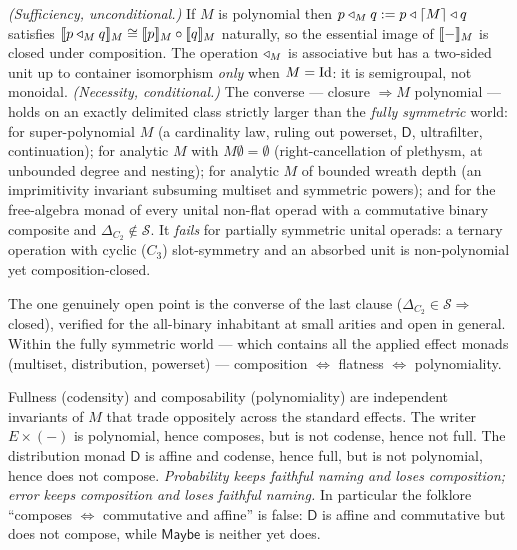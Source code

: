 \begin{theorem}[Composition $=$ polynomiality; \emph{peer-reviewed}]\label{thm:cob-compose}
\emph{(Sufficiency, unconditional.)} If $M$ is polynomial then
$p\triangleleft_M q:=p\triangleleft\lceil M\rceil\triangleleft q$ satisfies
$\llbracket p\triangleleft_M q \rrbracket_M\cong\llbracket p \rrbracket_M\circ\llbracket q \rrbracket_M$ naturally, so the essential image
of $\llbracket - \rrbracket_M$ is closed under composition. The operation $\triangleleft_M$ is associative
but has a two-sided unit up to container isomorphism \emph{only} when $M=\mathrm{Id}$: it
is semigroupal, not monoidal.
\emph{(Necessity, conditional.)} The converse --- closure $\Rightarrow M$
polynomial --- holds on an exactly delimited class strictly larger than the
\emph{fully symmetric} world: for super-polynomial $M$ (a cardinality law, ruling
out powerset, $\mathsf{D}$, ultrafilter, continuation); for analytic $M$ with
$M\emptyset=\emptyset$ (right-cancellation of plethysm, at unbounded degree and
nesting); for analytic $M$ of bounded wreath depth (an imprimitivity invariant
subsuming multiset and symmetric powers); and for the free-algebra monad of every
unital non-flat operad with a commutative binary composite and
$\Delta_{C_2}\notin\mathcal{S}$. It \emph{fails} for partially symmetric unital
operads: a ternary operation with cyclic ($C_3$) slot-symmetry and an absorbed
unit is non-polynomial yet composition-closed.
\end{theorem}

The one genuinely open point is the converse of the last clause
($\Delta_{C_2}\in\mathcal{S}\Rightarrow$ closed), verified for the all-binary
inhabitant at small arities and open in general. Within the fully symmetric world
--- which contains all the applied effect monads (multiset, distribution,
powerset) --- composition $\iff$ flatness $\iff$ polynomiality.

\begin{corollary}\label{cor:cob-tradeoff}
Fullness (codensity) and composability (polynomiality) are independent invariants
of $M$ that trade oppositely across the standard effects. The writer $E\times(-)$
is polynomial, hence composes, but is not codense, hence not full. The
distribution monad $\mathsf{D}$ is affine and codense, hence full, but is not polynomial,
hence does not compose. \emph{Probability keeps faithful naming and loses
composition; error keeps composition and loses faithful naming.} In particular
the folklore ``composes $\iff$ commutative and affine'' is false: $\mathsf{D}$ is affine
and commutative but does not compose, while $\mathsf{Maybe}$ is neither yet does.
\end{corollary}

